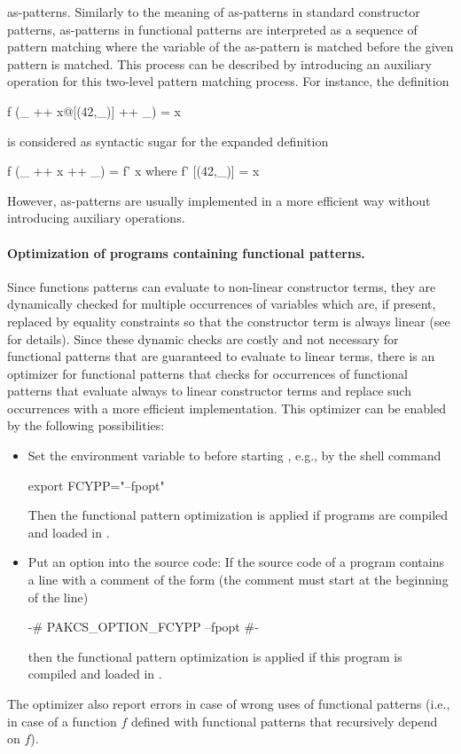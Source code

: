 as-patterns.
Similarly to the meaning of as-patterns
in standard constructor patterns,
as-patterns in functional patterns are interpreted
as a sequence of pattern matching where the variable of the as-pattern
is matched before the given pattern is matched.
This process can be described by introducing an auxiliary operation
for this two-level pattern matching process.
For instance, the definition
\begin{curry}
f (_ ++ x@[(42,_)] ++ _) = x
\end{curry}
is considered as syntactic sugar for the expanded definition
\begin{curry}
f (_ ++ x ++ _) = f' x
 where
  f' [(42,_)] = x
\end{curry}
However, as-patterns are usually implemented
in a more efficient way without introducing auxiliary operations.


\paragraph{Optimization of programs containing functional patterns.}
Since functions patterns can evaluate to non-linear constructor terms,
they are dynamically checked for multiple occurrences of
variables which are, if present, replaced by equality constraints
so that the constructor term is always linear
(see \cite{AntoyHanus05LOPSTR} for details).
Since these dynamic checks are costly and not necessary for
functional patterns that are guaranteed to evaluate to linear terms,
there is an optimizer for functional patterns that checks
for occurrences of functional patterns that evaluate always to
linear constructor terms and replace such occurrences
with a more efficient implementation.
This optimizer can be enabled by the following possibilities:
\begin{itemize}
\item
Set the environment variable  to 
before starting \CYS, e.g., by the shell command
\begin{curry}
export FCYPP="--fpopt"
\end{curry}
Then the functional pattern optimization is applied if programs are compiled
and loaded in \CYS.
\item
Put an option into the source code:
If the source code of a program
contains a line with a comment of the form (the comment
must start at the beginning of the line)
\begin{curry}
{-# PAKCS_OPTION_FCYPP --fpopt #-}
\end{curry}
then the functional pattern optimization is applied
if this program is compiled and loaded in \CYS.
\end{itemize}
The optimizer also report errors in case of wrong uses of functional patterns
(i.e., in case of a function $f$ defined with functional patterns that
recursively depend on $f$).


